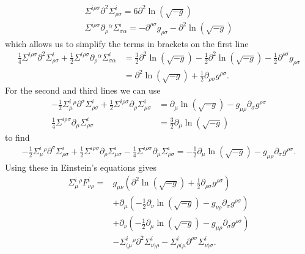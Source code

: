 \documentclass[10pt]{report}
\theoremstyle{definition}
\begin{document}
        \begin{align}
            \Sigma^{i\rho\sigma} \partial^2 \Sigma^i_{\rho\sigma} = 6 \partial^2 \ln(\sqrt{-g}) \\ \Sigma^{i\rho\sigma} \partial_\rho{}^\alpha \Sigma^i_{\sigma\alpha} = - \partial^{\rho\sigma} g_{\rho\sigma} - \partial^2 \ln(\sqrt{-g})
        \end{align}
        which allows us to simplify the terms in brackets on the first line
        \begin{align}
            \frac{1}{4} \Sigma^{i\rho\sigma} \partial^2 \Sigma^i_{\rho\sigma} + \frac{1}{2} \Sigma^{i\rho\sigma} \partial_{\rho}{}^\alpha \Sigma^i_{\sigma\alpha} &= \frac{3}{2} \partial^2 \ln(\sqrt{-g}) - \frac{1}{2} \partial^2 \ln(\sqrt{-g}) - \frac{1}{2} \partial^{\rho\sigma} g_{\rho\sigma}  \\ &= \partial^2 \ln(\sqrt{-g}) + \frac{1}{2} \partial_{\rho\sigma} g^{\rho\sigma}.
        \end{align}
        For the second and third lines we can use 
        \begin{align}
            -\frac{1}{2} \Sigma^i_\mu{}^\rho \partial^\sigma \Sigma^i_{\rho\sigma} + \frac{1}{2} \Sigma^{i\rho\sigma} \partial_\rho \Sigma^i_{\mu\sigma} &= \partial_\mu \ln(\sqrt{-g}) - g_{\mu\rho} \partial_\sigma g^{\rho\sigma} \\ \frac{1}{4} \Sigma^{i\rho\sigma} \partial_\mu \Sigma^i_{\rho\sigma} &= \frac{3}{2} \partial_\mu \ln(\sqrt{-g})
        \end{align}
        to find 
        \begin{align}
            -\frac{1}{2} \Sigma^i_\mu{}^\rho \partial^\sigma \Sigma^i_{\rho\sigma} + \frac{1}{2} \Sigma^{i\rho\sigma} \partial_\rho \Sigma^i_{\mu\sigma} - \frac{1}{4} \Sigma^{i\rho\sigma} \partial_\mu \Sigma^i_{\rho\sigma} = -\frac{1}{2} \partial_\mu \ln(\sqrt{-g}) - g_{\mu\rho} \partial_\sigma g^{\rho\sigma}.
        \end{align}
        Using these in Einstein's equations gives
        \begin{align}
            \Sigma^i_{\mu}{}^\rho F^i_{\nu\rho} = & g_{\mu\nu} \left( \partial^2 \ln(\sqrt{-g}) + \frac{1}{2} \partial_{\rho\sigma} g^{\rho\sigma} \right)  \\ & + \partial_{\mu} \left( -\frac{1}{2} \partial_\nu \ln(\sqrt{-g}) - g_{\nu\rho} \partial_\sigma g^{\rho\sigma} \right) \\ & + \partial_{\nu} \left( -\frac{1}{2} \partial_\mu \ln(\sqrt{-g}) - g_{\mu\rho} \partial_\sigma g^{\rho\sigma} \right) \\ & - \Sigma^i_{(\mu}{}^\rho \partial^2 \Sigma^i_{\nu)\rho} - \Sigma^i_{\rho(\mu} \partial^{\rho\sigma} \Sigma^i_{\nu)\sigma}.
        \end{align}
\end{document}
